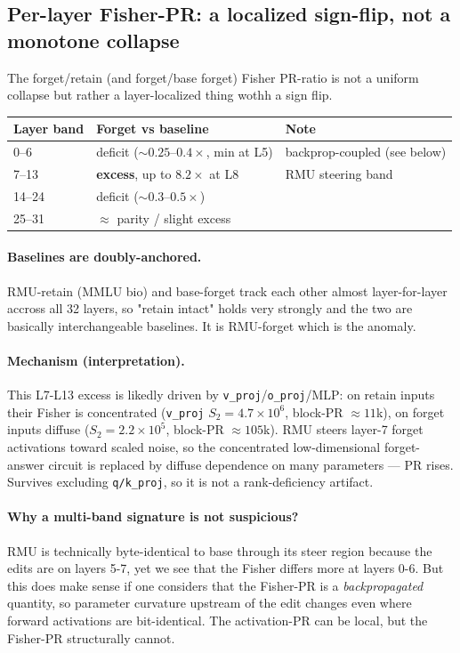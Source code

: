 \documentclass[11pt]{article}
\begin{document}
\subsection{Per-layer Fisher-PR: a localized sign-flip, not a monotone collapse}
The forget/retain (and forget/base forget) Fisher PR-ratio is not a uniform collapse but rather a layer-localized thing wothh a sign flip. 

\begin{center}
\begin{tabular}{lll}
\toprule
Layer band & Forget vs baseline & Note \\
\midrule
0--6   & deficit ($\sim 0.25$--$0.4\times$, min at L5) & backprop-coupled (see below) \\
7--13  & \textbf{excess}, up to $\mathbf{8.2\times}$ at L8 & RMU steering band \\
14--24 & deficit ($\sim 0.3$--$0.5\times$) & \\
25--31 & $\approx$ parity / slight excess & \\
\bottomrule
\end{tabular}
\end{center}

\paragraph{Baselines are doubly-anchored.} RMU-retain (MMLU bio) and base-forget track each other almost layer-for-layer accross all 32 layers, so "retain intact" holds very strongly and the two are basically interchangeable baselines. It is RMU-forget which is the anomaly.

\paragraph{Mechanism (interpretation).}
This L7-L13 excess is likedly driven by \texttt{v\_proj}/\texttt{o\_proj}/MLP:
on retain inputs their Fisher is concentrated (\texttt{v\_proj} $S_2 = 4.7\times10^{6}$,
block-PR $\approx 11$k), on forget inputs diffuse ($S_2 = 2.2\times10^{5}$, block-PR $\approx 105$k).
RMU steers layer-7 forget activations toward scaled noise, so the concentrated low-dimensional
forget-answer circuit is replaced by diffuse dependence on many parameters --- PR rises. Survives
excluding \texttt{q/k\_proj}, so it is not a rank-deficiency artifact.

\paragraph{Why a multi-band signature is not suspicious?}
RMU is technically byte-identical to base through its steer region because the edits are on layers 5-7, yet we see that the Fisher differs more at layers 0-6. But this does make sense if one considers that the Fisher-PR is a \emph{backpropagated} quantity, so parameter curvature upstream of the edit changes even where forward activations are bit-identical. The activation-PR can be local, but the Fisher-PR structurally cannot. 
\end{document}
